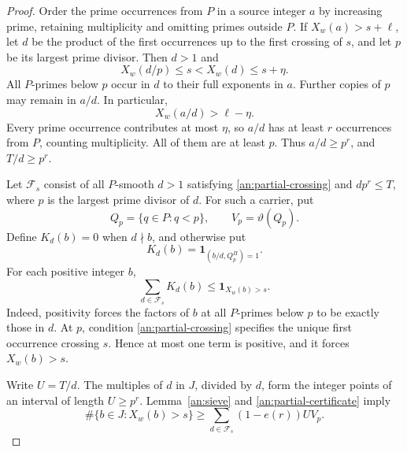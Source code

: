 \begin{proof}
Order the prime occurrences from \(P\) in a source integer \(a\) by
increasing prime, retaining multiplicity and omitting primes outside
\(P\). If \(X_w(a)>s+\ell\), let \(d\) be the product of the first
occurrences up to the first crossing of \(s\), and let \(p\) be its
largest prime divisor. Then \(d>1\) and
\begin{equation}
 X_w(d/p)\le s<X_w(d)\le s+\eta.
 \label{an:partial-crossing}
\end{equation}
All \(P\)-primes below \(p\) occur in \(d\) to their full exponents
in \(a\). Further copies of \(p\) may remain in \(a/d\). In particular,
\[
 X_w(a/d)>\ell-\eta.
\]
Every prime occurrence contributes at most \(\eta\), so \(a/d\) has at
least \(r\) occurrences from \(P\), counting multiplicity. All of them
are at least \(p\). Thus \(a/d\ge p^r\), and \(T/d\ge p^r\).

Let \(\mathcal F_s\) consist of all \(P\)-smooth \(d>1\) satisfying
\eqref{an:partial-crossing} and \(dp^r\le T\), where \(p\) is the
largest prime divisor of \(d\). For such a carrier, put
\[
 Q_p=\{q\in P:q<p\},\qquad V_p=\vartheta(Q_p).
\]
Define \(K_d(b)=0\) when \(d\nmid b\), and otherwise put
\[
 K_d(b)=\mathbf1_{(b/d,Q_p^{\Pi})=1}.
\]
For each positive integer \(b\),
\begin{equation}
 \sum_{d\in\mathcal F_s}K_d(b)
 \le \mathbf1_{X_w(b)>s}.
 \label{an:partial-certificate}
\end{equation}
Indeed, positivity forces the factors of \(b\) at all \(P\)-primes
below \(p\) to be exactly those in \(d\). At \(p\), condition
\eqref{an:partial-crossing} specifies the unique first occurrence
crossing \(s\). Hence at most one term is positive, and it forces
\(X_w(b)>s\).

Write \(U=T/d\). The multiples of \(d\) in \(J\), divided by \(d\),
form the integer points of an interval of length \(U\ge p^r\).
Lemma~\ref{an:sieve} and \eqref{an:partial-certificate} imply
\begin{equation}
 \#\{b\in J:X_w(b)>s\}
 \ge \sum_{d\in\mathcal F_s}(1-e(r))UV_p.
 \label{an:diffuse-target}
\end{equation}


\end{proof}
